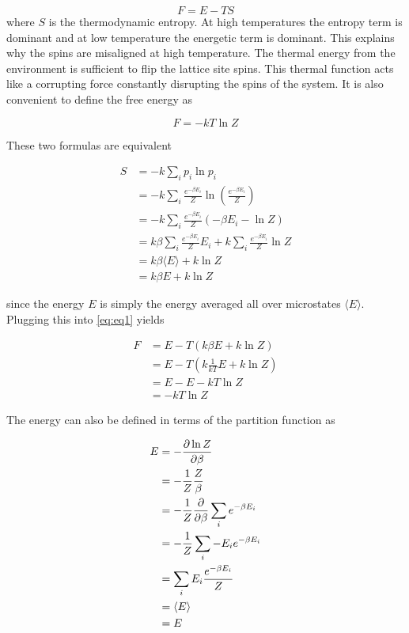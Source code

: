 \documentclass{article}
\begin{document}
\begin{equation}\label{eq:eq1}
    F = E - TS
\end{equation}
where $S$ is the thermodynamic entropy. At high temperatures the entropy term is dominant and at low temperature the energetic term is dominant.
This explains why the spins are misaligned at high temperature. The thermal energy from the environment is sufficient to flip the lattice site spins.
This thermal function acts like a corrupting force constantly disrupting the spins of the system. It is also convenient to define the free energy as

\begin{equation}
    F = -kT \ln Z
\end{equation}

These two formulas are equivalent


\begin{align}
    S &= -k \sum_i p_i \ln p_i \\
    &= -k \sum_i \frac{e^{-\beta E_i}}{Z} \ln \left(\frac{e^{-\beta E_i}}{Z} \right) \\
    &= -k \sum_i \frac{e^{-\beta E_i}}{Z} (-\beta E_i - \ln Z) \\
    &= k \beta \sum_i \frac{e^{-\beta E_i}}{Z} E_i + k \sum_i \frac{e^{-\beta E_i}}{Z} \ln Z \\
    &= k \beta \langle E \rangle + k \ln Z \\
    &= k \beta E + k \ln Z
\end{align}

since the energy $E$ is simply the energy averaged all over microstates $\langle E \rangle$. 
Plugging this into \eqref{eq:eq1} yields

\begin{align}
    F &= E - T (k \beta E + k \ln Z) \\
    &= E - T (k \frac{1}{kT} E + k \ln Z) \\
    &= E - E - kT \ln Z \\
    &= -kT \ln Z
\end{align}

The energy can also be defined in terms of the partition function as

\begin{align}
    E &= -\pdv{\ln Z}{\beta} \\
    &= -\frac{1}{Z} \frac{Z}{\beta} \\
    &= -\frac{1}{Z} \pdv{}{\beta} \sum_i e^{-\beta E_i} \\
    &= -\frac{1}{Z} \sum_i -E_i e^{-\beta E_i} \\
    &= \sum_i E_i \frac{e^{-\beta E_i}}{Z} \\
    &= \langle E \rangle \\
    &= E 
\end{align}
\end{document}
